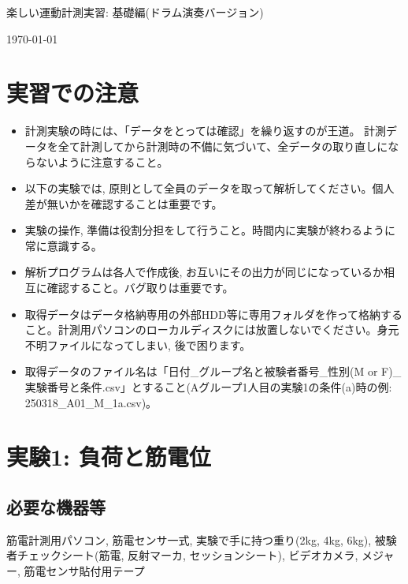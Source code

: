 \documentclass{ltjsarticle}
\begin{document}
\begin{center}
  {\LARGE 楽しい運動計測実習: 基礎編(ドラム演奏バージョン)}
\end{center}
\begin{flushright}
\today
\end{flushright}

\section*{実習での注意}
\begin{itemize}
\item 計測実験の時には、「データをとっては確認」を繰り返すのが王道。
  計測データを全て計測してから計測時の不備に気づいて、全データの取り直しにならないように注意すること。
\item 以下の実験では, 原則として全員のデータを取って解析してください。個人差が無いかを確認することは重要です。
\item 実験の操作, 準備は役割分担をして行うこと。時間内に実験が終わるように常に意識する。
\item 解析プログラムは各人で作成後, お互いにその出力が同じになっているか相互に確認すること。バグ取りは重要です。
\item 取得データはデータ格納専用の外部HDD等に専用フォルダを作って格納すること。計測用パソコンのローカルディスクには放置しないでください。身元不明ファイルになってしまい, 後で困ります。
\item 取得データのファイル名は「日付\_グループ名と被験者番号\_性別(M or F)\_実験番号と条件.csv」とすること(Aグループ1人目の実験1の条件(a)時の例: 250318\_A01\_M\_1a.csv)。
\end{itemize}

\section{実験1: 負荷と筋電位}

\subsection{必要な機器等}

筋電計測用パソコン, 筋電センサ一式, 実験で手に持つ重り(2kg, 4kg, 6kg), 被験者チェックシート(筋電, 反射マーカ, セッションシート), ビデオカメラ, メジャー, 筋電センサ貼付用テープ
\end{document}
